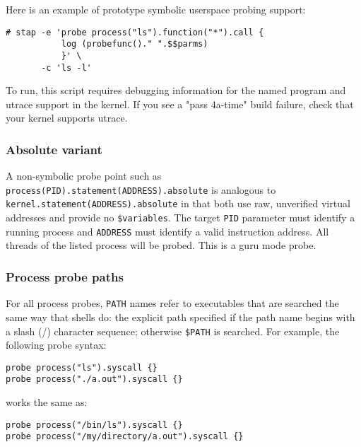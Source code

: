 \documentclass[twoside,english]{article}
\newenvironment{vindent}
{\begin{list}{}{\setlength{\listparindent}{6pt}}
\item[]}
{\end{list}}
\begin{document}
Here is an example of prototype symbolic userspace probing support:
\begin{vindent}
\begin{verbatim}
# stap -e 'probe process("ls").function("*").call {
           log (probefunc()." ".$$parms)
           }' \
       -c 'ls -l'
\end{verbatim}
\end{vindent}

To run, this script requires debugging information for the named
program and utrace support in the kernel. If you see a "pass 4a-time"
build failure, check that your kernel supports utrace.

\subsubsection{Absolute variant}
\label{sec:absolutevariant}
A non-symbolic probe point such as
\texttt{process(PID).statement(ADDRESS).absolute} is analogous to
\newline\texttt{kernel.statement(ADDRESS).absolute} in that both use
raw, unverified virtual addresses and provide no \texttt{\$variables}.
The target \texttt{PID} parameter must identify a running process and
\texttt{ADDRESS} must identify a valid instruction address.  All
threads of the listed process will be probed.  This is a guru mode
probe.

\subsubsection{Process probe paths}
\label{sec:paths}
For all process probes, \texttt{PATH} names refer to executables that
are searched the same way that shells do: the explicit path specified
if the path name begins with a slash (/) character sequence; otherwise
\texttt{\$PATH} is searched.  For example, the following probe syntax:
\begin{vindent}
\begin{verbatim}
probe process("ls").syscall {}
probe process("./a.out").syscall {}
\end{verbatim}
\end{vindent}

works the same as:
\begin{vindent}
\begin{verbatim}
probe process("/bin/ls").syscall {}
probe process("/my/directory/a.out").syscall {}
\end{verbatim}
\end{vindent}
\end{document}
